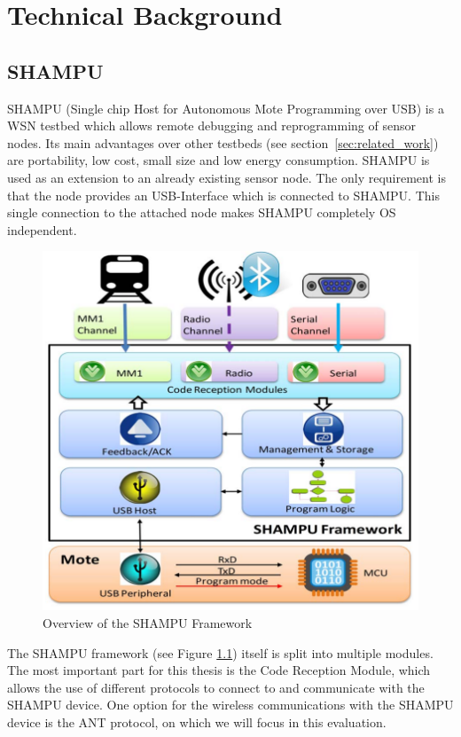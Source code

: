 \chapter{Technical Background}
\section{SHAMPU}
SHAMPU (Single chip Host for Autonomous Mote Programming over USB) \cite{Smeets:2014:DAL:2602339.2602401} is a WSN testbed which allows remote debugging and reprogramming of sensor nodes. Its main advantages over other testbeds (see section~\ref{sec:related_work}) are portability, low cost, small size and low energy consumption. SHAMPU is used as an extension to an already existing sensor node. The only requirement is that the node provides an USB-Interface which is connected to SHAMPU. This single connection to the attached node makes SHAMPU completely OS independent.
\begin{figure}[h]
	\centering
	\includegraphics[scale=.5]{content/images/SHAMPUframework.png}
	\caption{Overview of the SHAMPU Framework \cite{Smeets:2014:DAL:2602339.2602401}}\label{fig:shampuframework}
\end{figure}
The SHAMPU framework (see Figure \ref{fig:shampuframework}) itself is split into multiple modules. The most important part for this thesis is the Code Reception Module, which allows the use of different protocols to connect to and communicate with the SHAMPU device. One option for the wireless communications with the SHAMPU device is the ANT protocol, on which we will focus in this evaluation.

